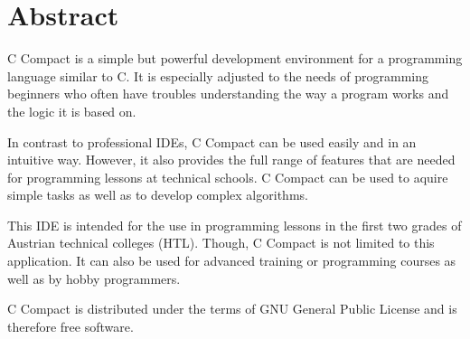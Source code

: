 

\chapter*{Abstract}



C Compact is a simple but powerful development environment for a programming language similar to C. It is especially adjusted to the needs of programming beginners who often have troubles understanding the way a program works and the logic it is based on.

In contrast to professional IDEs, C Compact can be used easily and in an intuitive way. However, it also provides the full range of features that are needed for programming lessons at technical schools. C Compact can be used to aquire simple tasks as well as to develop complex algorithms.

This IDE is intended for the use in programming lessons in the first two grades of Austrian technical colleges (HTL). Though, C Compact is not limited to this application. It can also be used for advanced training or programming courses as well as by hobby programmers.

C Compact is distributed under the terms of GNU General Public License and is therefore free software. 